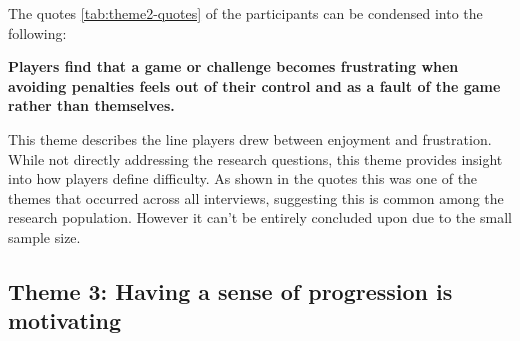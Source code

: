 The quotes \ref{tab:theme2-quotes} of the participants can be condensed into the following:
\begin{center}
    \textbf{Players find that a game or challenge becomes frustrating when avoiding penalties feels out of their control and as a fault of the game rather than themselves.}
\end{center}

This theme describes the line players drew between enjoyment and frustration. While not directly addressing the research questions, this theme provides insight into how players define difficulty. As shown in the quotes this was one of the themes that occurred across all interviews, suggesting this is common among the research population. However it can't be entirely concluded upon due to the small sample size. 

\subsection{Theme 3: Having a sense of progression is motivating}\label{Theme 3}

